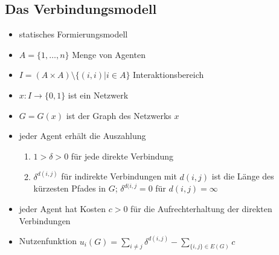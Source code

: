 \subsection{Das Verbindungsmodell}
	\begin{itemize}
		\item statisches Formierungsmodell
		\item $A=\{1,\dots,n\}$ Menge von Agenten
		\item $I=(A\times A)\setminus\{(i,i)|i\in A\}$ Interaktionsbereich
		\item $x:I\rightarrow\{0,1\}$ ist ein Netzwerk
		\item $G=G(x)$ ist der Graph des Netzwerks $x$
		\item jeder Agent erhält die Auszahlung
			\begin{enumerate}
				\item $1>\delta>0$ für jede direkte Verbindung
				\item $\delta^{d(i,j)}$ für indirekte Verbindungen mit $d(i,j)$ ist die Länge des kürzesten Pfades in $G$; $\delta^{d(i,j}=0$ für $d(i,j)=\infty$
			\end{enumerate}
		\item jeder Agent hat Kosten $c>0$ für die Aufrechterhaltung der direkten Verbindungen
		\item Nutzenfunktion $u_i(G)=\sum\limits_{i\neq j}\delta^{d(i,j)}-\sum\limits_{\{i,j\}\in E(G)}c$
	\end{itemize}
